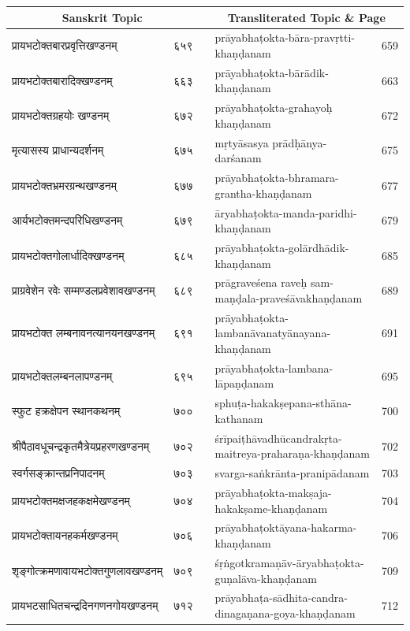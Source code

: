 \documentclass[11pt,a4paper]{article}
\newcommand{\dev}[1]{{\devanagarifont\mdseries\upshape #1}}
\begin{document}
\noindent\begin{minipage}{\textwidth}
\centering
\small
\begin{longtable}{p{}rp{}p{}r}
\toprule
\multicolumn{2}{c}{\dev{Sanskrit Topic}} && \multicolumn{2}{c}{Transliterated Topic \& Page} \\
\midrule
\endhead
\dev{प्रायभटोक्तबारप्रवृत्तिखण्डनम्} & ६५९ && prāyabhaṭokta-bāra-pravṛtti-khaṇḍanam & 659 \\
\dev{प्रायभटोक्तबारादिक्खण्डनम्} & ६६३ && prāyabhaṭokta-bārādik-khaṇḍanam & 663 \\
\dev{प्रायभटोक्तग्रहयोः खण्डनम्} & ६७२ && prāyabhaṭokta-grahayoḥ khaṇḍanam & 672 \\
\dev{मृत्यासस्य प्राधान्यदर्शनम्} & ६७५ && mṛtyāsasya prādḥānya-darśanam & 675 \\
\dev{प्रायभटोक्तभ्रमरग्रन्थखण्डनम्} & ६७७ && prāyabhaṭokta-bhramara-grantha-khaṇḍanam & 677 \\
\dev{आर्यभटोक्तमन्दपरिधिखण्डनम्} & ६७९ && āryabhaṭokta-manda-paridhi-khaṇḍanam & 679 \\
\dev{प्रायभटोक्तगोलार्धादिक्खण्डनम्} & ६८५ && prāyabhaṭokta-golārdhādik-khaṇḍanam & 685 \\
\dev{प्राग्रवेशेन रवेः सम्मण्डलप्रवेशावखण्डनम्} & ६८९ && prāgraveśena raveḥ sam-maṇḍala-praveśāvakhaṇḍanam & 689 \\
\dev{प्रायभटोक्त लम्बनावनत्यानयनखण्डनम्} & ६९१ && prāyabhaṭokta-lambanāvanatyānayana-khaṇḍanam & 691 \\
\dev{प्रायभटोक्तलम्बनलापण्डनम्} & ६९५ && prāyabhaṭokta-lambana-lāpaṇḍanam & 695 \\
\dev{स्फुट हक्रक्षेपन स्थानकथनम्} & ७०० && sphuṭa-hakakṣepana-sthāna-kathanam & 700 \\
\dev{श्रीपैठावधूचन्द्रकृतमैत्रेयप्रहरणखण्डनम्} & ७०२ && śrīpaiṭhāvadhūcandrakṛta-maitreya-praharaṇa-khaṇḍanam & 702 \\
\dev{स्वर्गसङ्क्रान्तप्रनिपादनम्} & ७०३ && svarga-saṅkrānta-pranipādanam & 703 \\
\dev{प्रायभटोक्तमक्षजहकक्षमेखण्डनम्} & ७०४ && prāyabhaṭokta-makṣaja-hakakṣame-khaṇḍanam & 704 \\
\dev{प्रायभटोक्तायनहकर्मखण्डनम्} & ७०६ && prāyabhaṭoktāyana-hakarma-khaṇḍanam & 706 \\
\dev{शृङ्गोत्क्रमणावायभटोक्तगुणलावखण्डनम्} & ७०९ && śṛṅgotkramaṇāv-āryabhaṭokta-guṇalāva-khaṇḍanam & 709 \\
\dev{प्रायभटसाधितचन्द्रदिनगणनगोयखण्डनम्} & ७१२ && prāyabhaṭa-sādhita-candra-dinagaṇana-goya-khaṇḍanam & 712 \\

\end{longtable}
\end{minipage}
\end{document}
